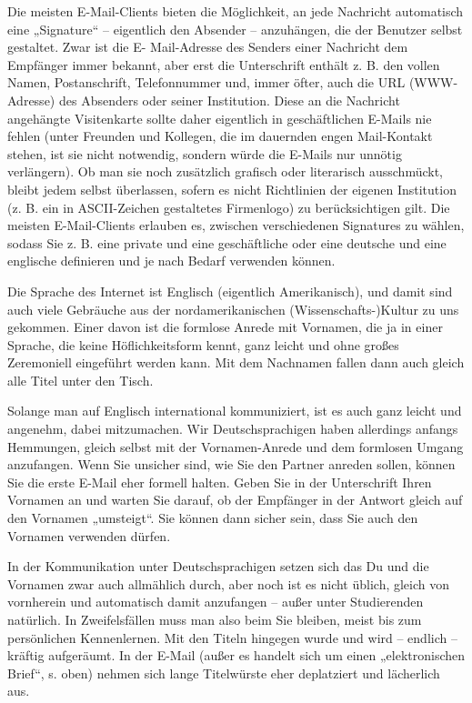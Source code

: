 \documentclass[]{book}
\theoremstyle{definition}
\theoremstyle{definition}
\theoremstyle{definition}
\theoremstyle{remark}
\begin{document}
Die meisten E-Mail-Clients bieten die Möglichkeit, an jede Nachricht
automatisch eine „Signature`` -- eigentlich den Absender -- anzuhängen,
die der Benutzer selbst gestaltet. Zwar ist die E- Mail-Adresse des
Senders einer Nachricht dem Empfänger immer bekannt, aber erst die
Unterschrift enthält z. B. den vollen Namen, Postanschrift,
Telefonnummer und, immer öfter, auch die URL (WWW-Adresse) des Absenders
oder seiner Institution. Diese an die Nachricht angehängte Visitenkarte
sollte daher eigentlich in geschäftlichen E-Mails nie fehlen (unter
Freunden und Kollegen, die im dauernden engen Mail-Kontakt stehen, ist
sie nicht notwendig, sondern würde die E-Mails nur unnötig verlängern).
Ob man sie noch zusätzlich grafisch oder literarisch ausschmückt, bleibt
jedem selbst überlassen, sofern es nicht Richtlinien der eigenen
Institution (z. B. ein in ASCII-Zeichen gestaltetes Firmenlogo) zu
berücksichtigen gilt. Die meisten E-Mail-Clients erlauben es, zwischen
verschiedenen Signatures zu wählen, sodass Sie z. B. eine private und
eine geschäftliche oder eine deutsche und eine englische definieren und
je nach Bedarf verwenden können.

Die Sprache des Internet ist Englisch (eigentlich Amerikanisch), und
damit sind auch viele Gebräuche aus der nordamerikanischen
(Wissenschafts-)Kultur zu uns gekommen. Einer davon ist die formlose
Anrede mit Vornamen, die ja in einer Sprache, die keine Höflichkeitsform
kennt, ganz leicht und ohne großes Zeremoniell eingeführt werden kann.
Mit dem Nachnamen fallen dann auch gleich alle Titel unter den Tisch.

Solange man auf Englisch international kommuniziert, ist es auch ganz
leicht und angenehm, dabei mitzumachen. Wir Deutschsprachigen haben
allerdings anfangs Hemmungen, gleich selbst mit der Vornamen-Anrede und
dem formlosen Umgang anzufangen. Wenn Sie unsicher sind, wie Sie den
Partner anreden sollen, können Sie die erste E-Mail eher formell halten.
Geben Sie in der Unterschrift Ihren Vornamen an und warten Sie darauf,
ob der Empfänger in der Antwort gleich auf den Vornamen „umsteigt``. Sie
können dann sicher sein, dass Sie auch den Vornamen verwenden dürfen.

In der Kommunikation unter Deutschsprachigen setzen sich das Du und die
Vornamen zwar auch allmählich durch, aber noch ist es nicht üblich,
gleich von vornherein und automatisch damit anzufangen -- außer unter
Studierenden natürlich. In Zweifelsfällen muss man also beim Sie
bleiben, meist bis zum persönlichen Kennenlernen. Mit den Titeln
hingegen wurde und wird -- endlich -- kräftig aufgeräumt. In der E-Mail
(außer es handelt sich um einen „elektronischen Brief``, s. oben) nehmen
sich lange Titelwürste eher deplatziert und lächerlich aus.
\end{document}
